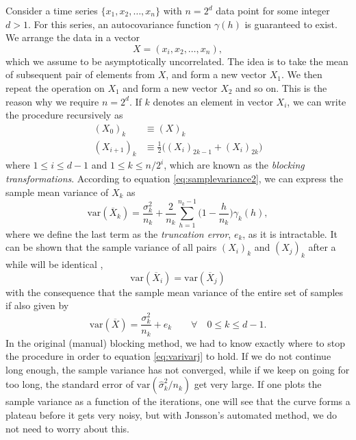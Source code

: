 Consider a time series $\{x_1, x_2, \hdots, x_n\}$ with $n=2^d$ data point for some integer $d>1$. For this series, an autocovariance function $\gamma(h)$ is guaranteed to exist. We arrange the data in a vector
\begin{equation}
X=(x_i,x_2,\hdots,x_n),
\end{equation}
which we assume to be asymptotically uncorrelated. The idea is to take the mean of subsequent pair of elements from $X$, and form a new vector $X_1$. We then repeat the operation on $X_1$ and form a new vector $X_2$ and so on. This is the reason why we require $n=2^d$. If $k$ denotes an element in vector $X_i$, we can write the procedure recursively as
\begin{equation}
\begin{aligned}
(X_0)_k&\equiv(X)_k\\
(X_{i+1})_k&\equiv\frac{1}{2}\Big((X_i)_{2k-1}+(X_i)_{2k}\Big)
\end{aligned}
\end{equation}
where $1\leq i\leq d-1$ and $1\leq k\leq n/2^i$, which are known as the \textit{blocking transformations}. According to equation \eqref{eq:samplevariance2}, we can express the sample mean variance of $X_k$ as
\begin{equation}
\text{var}(\overline{X}_k)=\frac{\sigma_k^2}{n_k}+\frac{2}{n_k}\sum_{h=1}^{n_k-1}\Big(1-\frac{h}{n_k}\Big)\gamma_k(h),
\end{equation}
where we define the last term as the \textit{truncation error}, $e_k$, as it is intractable. It can be shown that the sample variance of all pairs $(X_i)_k$ and $(X_j)_k$ after a while will be identical \cite{flyvbjerg_error_1989},
\begin{equation}
\text{var}(\overline{X}_i)=\text{var}(\overline{X}_j)
\label{eq:varivarj}
\end{equation}
with the consequence that the sample mean variance of the entire set of samples if also given by
\begin{equation}
\text{var}(\overline{X})=\frac{\sigma_k^2}{n_k}+e_k\quad\quad\forall\quad 0\leq k\leq d-1.
\end{equation}
In the original (manual) blocking method, we had to know exactly where to stop the procedure in order to equation \eqref{eq:varivarj} to hold. If we do not continue long enough, the sample variance has not converged, while if we keep on going for too long, the standard error of $\text{var}(\hat{\sigma}_k^2/n_k)$ get very large. If one plots the sample variance as a function of the iterations, one will see that the curve forms a plateau before it gets very noisy, but with Jonsson's automated method, we do not need to worry about this. 

